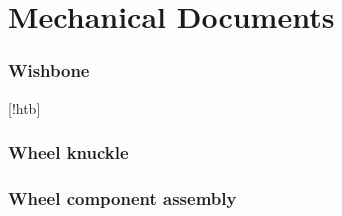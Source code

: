 \chapter{Mechanical Documents}
\label{App:mech}
\pagestyle{duncan}

\subsection{Wishbone}
[!htb]
\subsection{Wheel knuckle}

\subsection{Wheel component assembly}
